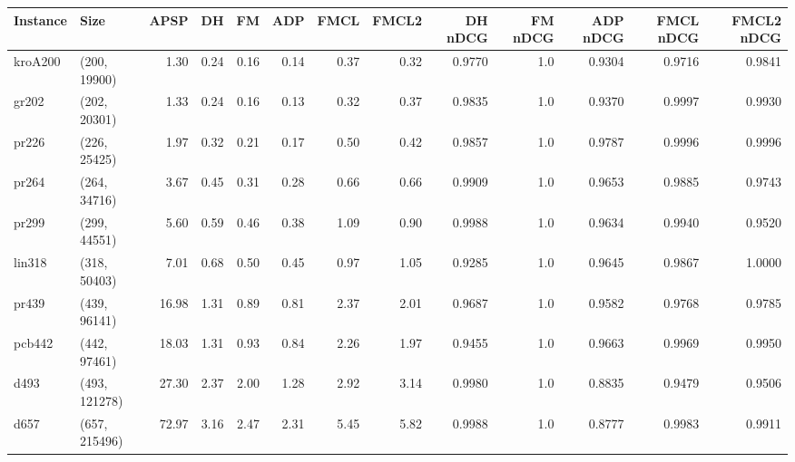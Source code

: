 \begin{tabular}{llrrrrrrrrrrr}
\toprule
Instance &          Size &  APSP &   DH &   FM &  ADP &  FMCL &  FMCL2 &  DH nDCG &  FM nDCG &  ADP nDCG &  FMCL nDCG &  FMCL2 nDCG \\
\midrule
 kroA200 &  (200, 19900) &  1.30 & 0.24 & 0.16 & 0.14 &  0.37 &   0.32 &   0.9770 &      1.0 &    0.9304 &     0.9716 &      0.9841 \\
   gr202 &  (202, 20301) &  1.33 & 0.24 & 0.16 & 0.13 &  0.32 &   0.37 &   0.9835 &      1.0 &    0.9370 &     0.9997 &      0.9930 \\
   pr226 &  (226, 25425) &  1.97 & 0.32 & 0.21 & 0.17 &  0.50 &   0.42 &   0.9857 &      1.0 &    0.9787 &     0.9996 &      0.9996 \\
   pr264 &  (264, 34716) &  3.67 & 0.45 & 0.31 & 0.28 &  0.66 &   0.66 &   0.9909 &      1.0 &    0.9653 &     0.9885 &      0.9743 \\
   pr299 &  (299, 44551) &  5.60 & 0.59 & 0.46 & 0.38 &  1.09 &   0.90 &   0.9988 &      1.0 &    0.9634 &     0.9940 &      0.9520 \\
  lin318 &  (318, 50403) &  7.01 & 0.68 & 0.50 & 0.45 &  0.97 &   1.05 &   0.9285 &      1.0 &    0.9645 &     0.9867 &      1.0000 \\
   pr439 &  (439, 96141) & 16.98 & 1.31 & 0.89 & 0.81 &  2.37 &   2.01 &   0.9687 &      1.0 &    0.9582 &     0.9768 &      0.9785 \\
  pcb442 &  (442, 97461) & 18.03 & 1.31 & 0.93 & 0.84 &  2.26 &   1.97 &   0.9455 &      1.0 &    0.9663 &     0.9969 &      0.9950 \\
    d493 & (493, 121278) & 27.30 & 2.37 & 2.00 & 1.28 &  2.92 &   3.14 &   0.9980 &      1.0 &    0.8835 &     0.9479 &      0.9506 \\
    d657 & (657, 215496) & 72.97 & 3.16 & 2.47 & 2.31 &  5.45 &   5.82 &   0.9988 &      1.0 &    0.8777 &     0.9983 &      0.9911 \\
\bottomrule
\end{tabular}
